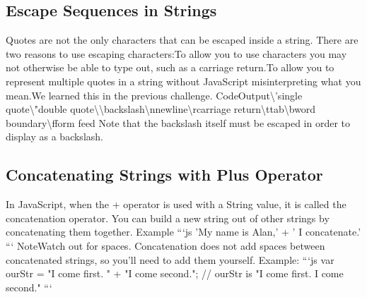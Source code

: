 \documentclass{article}%
\begin{document}
\subsection{Escape Sequences in Strings}%
\label{subsec:EscapeSequencesinStrings}%
Quotes are not the only characters that can be escaped inside a string. There are two reasons to use escaping characters:To allow you to use characters you may not otherwise be able to type out, such as a carriage return.To allow you to represent multiple quotes in a string without JavaScript misinterpreting what you mean.We learned this in the previous challenge.\newline%
CodeOutput\textbackslash{}'single quote\textbackslash{}"double quote\textbackslash{}\textbackslash{}backslash\textbackslash{}nnewline\textbackslash{}rcarriage return\textbackslash{}ttab\textbackslash{}bword boundary\textbackslash{}fform feed\newline%
Note that the backslash itself must be escaped in order to display as a backslash.\newline%

%
\subsection{Concatenating Strings with Plus Operator}%
\label{subsec:ConcatenatingStringswithPlusOperator}%
In JavaScript, when the + operator is used with a String value, it is called the concatenation operator. You can build a new string out of other strings by concatenating them together.\newline%
Example\newline%
```js\newline%
'My name is Alan,' + ' I concatenate.'\newline%
```\newline%
NoteWatch out for spaces. Concatenation does not add spaces between concatenated strings, so you'll need to add them yourself.\newline%
Example:\newline%
```js\newline%
var ourStr = "I come first. " + "I come second.";\newline%
// ourStr is "I come first. I come second."\newline%
```\newline%

%
\end{document}
